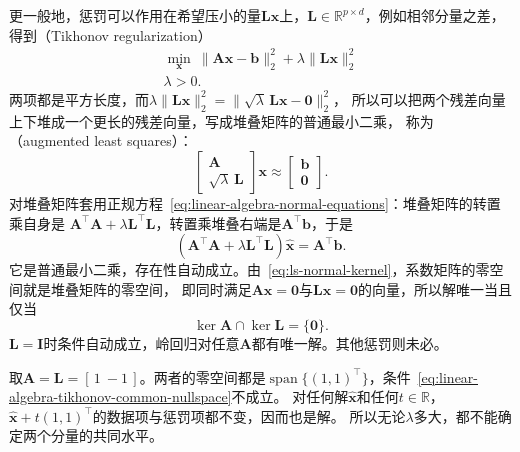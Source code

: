 更一般地，惩罚可以作用在希望压小的量$\bm L\bm x$上，$\bm L\in\mathbb R^{p\times d}$，例如相邻分量之差，
得到（Tikhonov regularization）
\begin{equation}
\begin{gathered}
\min_{\bm x}\ \lVert\bm A\bm x-\bm b\rVert_2^2+\lambda\lVert\bm L\bm x\rVert_2^2\\
\lambda>0.
\end{gathered}
\label{eq:linear-algebra-general-tikhonov}
\end{equation}
两项都是平方长度，而$\lambda\lVert\bm L\bm x\rVert_2^2=\lVert\sqrt\lambda\,\bm L\bm x-\bm0\rVert_2^2$，
所以可以把两个残差向量上下堆成一个更长的残差向量，写成堆叠矩阵的普通最小二乘，
称为（augmented least squares）：
\begin{equation}
 \begin{bmatrix}\bm A\\ \sqrt{\lambda}\,\bm L\end{bmatrix}\bm x
 \approx\begin{bmatrix}\bm b\\ \bm0\end{bmatrix}.
 \label{eq:ls-augmented-system}
\end{equation}
对堆叠矩阵套用正规方程~\eqref{eq:linear-algebra-normal-equations}：堆叠矩阵的转置乘自身是
$\bm A^\top\bm A+\lambda\bm L^\top\bm L$，转置乘堆叠右端是$\bm A^\top\bm b$，于是
\begin{equation}
 (\bm A^\top\bm A+\lambda\bm L^\top\bm L)\hat{\bm x}=\bm A^\top\bm b.
 \label{eq:ls-tikhonov-normal}
\end{equation}
它是普通最小二乘，存在性自动成立。由~\eqref{eq:ls-normal-kernel}，系数矩阵的零空间就是堆叠矩阵的零空间，
即同时满足$\bm A\bm x=\bm0$与$\bm L\bm x=\bm0$的向量，所以解唯一当且仅当
\begin{equation}
 \ker\bm A\cap\ker\bm L=\{\bm0\}.
 \label{eq:linear-algebra-tikhonov-common-nullspace}
\end{equation}
$\bm L=\bm I$时条件自动成立，岭回归对任意$\bm A$都有唯一解。其他惩罚则未必。

\begin{example}[反例：惩罚无法确定的方向]
\label{ex:ls-tikhonov-common-nullspace}
取$\bm A=\bm L=[\,1\ -1\,]$。两者的零空间都是$\operatorname{span}\{(1,1)^\top\}$，条件~\eqref{eq:linear-algebra-tikhonov-common-nullspace}不成立。
对任何解$\hat{\bm x}$和任何$t\in\mathbb R$，$\hat{\bm x}+t(1,1)^\top$的数据项与惩罚项都不变，因而也是解。
所以无论$\lambda$多大，都不能确定两个分量的共同水平。
\end{example}


